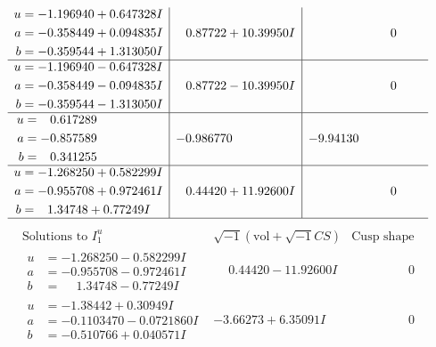\documentclass[1p]{elsarticle_modified}
\theoremstyle{definition}
\newcommand{\I}{\sqrt{-1}}
\begin{document}
$$\begin{array}{c|c|c}
\begin{aligned}
u &= -1.196940 + 0.647328 I \\
a &= -0.358449 + 0.094835 I \\
b &= -0.359544 + 1.313050 I\end{aligned}
 & \phantom{-}0.87722 + 10.39950 I & \phantom{-0.000000 } 0 \\ \hline\begin{aligned}
u &= -1.196940 - 0.647328 I \\
a &= -0.358449 - 0.094835 I \\
b &= -0.359544 - 1.313050 I\end{aligned}
 & \phantom{-}0.87722 - 10.39950 I & \phantom{-0.000000 } 0 \\ \hline\begin{aligned}
u &= \phantom{-}0.617289\phantom{ +0.000000I} \\
a &= -0.857589\phantom{ +0.000000I} \\
b &= \phantom{-}0.341255\phantom{ +0.000000I}\end{aligned}
 & -0.986770\phantom{ +0.000000I} & -9.94130\phantom{ +0.000000I} \\ \hline\begin{aligned}
u &= -1.268250 + 0.582299 I \\
a &= -0.955708 + 0.972461 I \\
b &= \phantom{-}1.34748 + 0.77249 I\end{aligned}
 & \phantom{-}0.44420 + 11.92600 I & \phantom{-0.000000 } 0\\
 \hline 
 \end{array}$$\newpage$$\begin{array}{c|c|c}  
\text{Solutions to }I^u_{1}& \I (\text{vol} + \sqrt{-1}CS) & \text{Cusp shape}\\
 \hline 
\begin{aligned}
u &= -1.268250 - 0.582299 I \\
a &= -0.955708 - 0.972461 I \\
b &= \phantom{-}1.34748 - 0.77249 I\end{aligned}
 & \phantom{-}0.44420 - 11.92600 I & \phantom{-0.000000 } 0 \\ \hline\begin{aligned}
u &= -1.38442 + 0.30949 I \\
a &= -0.1103470 - 0.0721860 I \\
b &= -0.510766 + 0.040571 I\end{aligned}
 & -3.66273 + 6.35091 I & \phantom{-0.000000 } 0 \\ \hline\begin{aligned}

\end{aligned}
\end{array}$$
\end{document}
